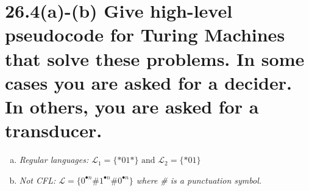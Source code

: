 \documentclass{article}
\begin{document}
\section*{26.4(a)-(b)  \normalsize Give high-level pseudocode for Turing Machines that solve these problems. In some cases you are asked for a decider. In others, you are asked for a transducer.}

\begin{enumerate}[(a)]
  \item \textit{Regular languages: $\mathscr{L}_1 = \{*01*\} \text{ and } \mathscr{L}_2 = \{*01\}$}
  \item \textit{Not CFL: $\mathscr{L} = \{0^{\bullet n}\#1^{\bullet n}\#0^{\bullet n}\}$ where \# is a punctuation symbol.}
\end{enumerate}
\end{document}
